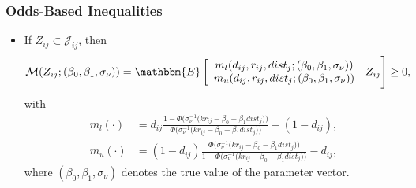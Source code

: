 \begin{frame}[label=odds]
\frametitle{Odds-Based Inequalities}

\begin{itemize}
	\item If $Z_{ij}\subset\mathcal{J}_{ij}$, then
	\begin{align*}
	\mathcal{M}(Z_{ij};(\beta_{0},\beta_{1},\sigma_{\nu}))=\mathbbm{E}
	\left[
	\begin{array}{c}
	m_{l}(d_{ij},r_{ij},dist_{j};(\beta_{0},\beta_{1},\sigma_{\nu}))\\
	m_{u}(d_{ij},r_{ij},dist_{j};(\beta_{0},\beta_{1},\sigma_{\nu}))\\
	\end{array}\right|
	Z_{ij}
	\Bigg]\geq0,
	\end{align*}
	with
	\begin{align*}
	m_{l}(\cdot)&=d_{ij}\frac{1-\Phi\big(\sigma_{\nu}^{-1}\big(kr_{ij}-\beta_{0}-\beta_{1}dist_{j}\big)\big)}{\Phi\big(\sigma_{\nu}^{-1}\big(kr_{ij}-\beta_{0}-\beta_{1}dist_{j}\big)\big)}-(1-d_{ij}),\\
	m_{u}(\cdot)&=(1-d_{ij})\frac{\Phi\big(\sigma_{\nu}^{-1}\big(kr_{ij}-\beta_{0}-\beta_{1}dist_{j}\big)\big)}{1-\Phi\big(\sigma_{\nu}^{-1}\big(kr_{ij}-\beta_{0}-\beta_{1}dist_{j}\big)\big)}-d_{ij},
	\end{align*}
	where $(\beta_{0},\beta_{1},\sigma_{\nu})$ denotes the true value of the parameter vector.
\end{itemize}
\end{frame}
